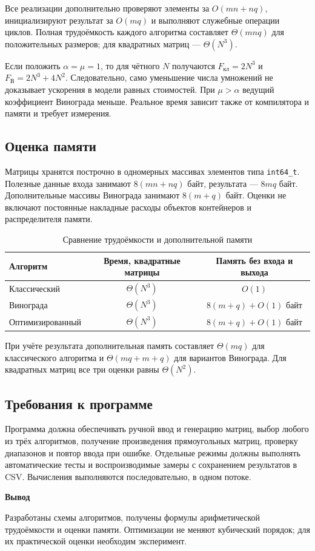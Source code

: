 \documentclass[14pt,a4paper]{extarticle}
\newcommand{\conclusion}[1]{\par\medskip\noindent\hspace*{\parindent}\textbf{Вывод}\par\indent #1\par}
\numberwithin{equation}{section}
\begin{document}
Все реализации дополнительно проверяют элементы за $O(mn+nq)$, инициализируют результат за $O(mq)$ и выполняют служебные операции циклов. Полная трудоёмкость каждого алгоритма составляет $\Theta(mnq)$ для положительных размеров; для квадратных матриц — $\Theta(N^3)$.

Если положить $\alpha=\mu=1$, то для чётного $N$ получаются $F_{\text{кл}}=2N^3$ и $F_{\text{В}}=2N^3+4N^2$. Следовательно, само уменьшение числа умножений не доказывает ускорения в модели равных стоимостей. При $\mu>\alpha$ ведущий коэффициент Винограда меньше. Реальное время зависит также от компилятора и памяти и требует измерения.

\subsection{Оценка памяти}
Матрицы хранятся построчно в одномерных массивах элементов типа \texttt{int64\_t}. Полезные данные входа занимают $8(mn+nq)$ байт, результата — $8mq$ байт. Дополнительные массивы Винограда занимают $8(m+q)$ байт. Оценки не включают постоянные накладные расходы объектов контейнеров и распределителя памяти.
\begin{table}[H]\centering
\caption{Сравнение трудоёмкости и дополнительной памяти}\label{tab:theory}
\small\begin{tabularx}{\textwidth}{|X|c|c|}\hline
Алгоритм & Время, квадратные матрицы & Память без входа и выхода\\\hline
Классический & $\Theta(N^3)$ & $O(1)$\\\hline
Винограда & $\Theta(N^3)$ & $8(m+q)+O(1)$ байт\\\hline
Оптимизированный & $\Theta(N^3)$ & $8(m+q)+O(1)$ байт\\\hline
\end{tabularx}\end{table}
При учёте результата дополнительная память составляет $\Theta(mq)$ для классического алгоритма и $\Theta(mq+m+q)$ для вариантов Винограда. Для квадратных матриц все три оценки равны $\Theta(N^2)$.

\subsection{Требования к программе}
Программа должна обеспечивать ручной ввод и генерацию матриц, выбор любого из трёх алгоритмов, получение произведения прямоугольных матриц, проверку диапазонов и повтор ввода при ошибке. Отдельные режимы должны выполнять автоматические тесты и воспроизводимые замеры с сохранением результатов в CSV. Вычисления выполняются последовательно, в одном потоке.
\conclusion{Разработаны схемы алгоритмов, получены формулы арифметической трудоёмкости и оценки памяти. Оптимизации не меняют кубический порядок; для их практической оценки необходим эксперимент.}
\end{document}
